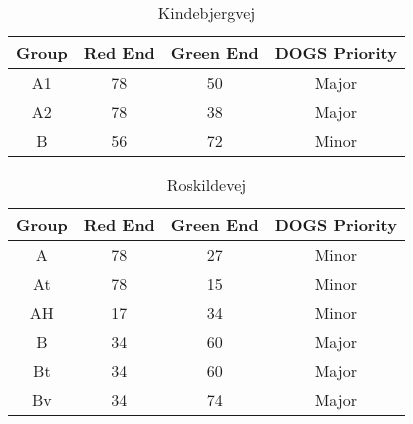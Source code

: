 \begin{table}[ht]
\centering
\begin{tabular}{c|c|c|c}
\textbf{Group} & \textbf{Red End} & \textbf{Green End} & \textbf{DOGS Priority}\\ \hline
A1 & 78 & 50 & Major\\
A2 & 78 & 38 & Major\\
B & 56 & 72 & Minor\\
\end{tabular}
\caption{Kindebjergvej}
\end{table}

\begin{table}[ht]
\centering
\begin{tabular}{c|c|c|c}
\textbf{Group} & \textbf{Red End} & \textbf{Green End} & \textbf{DOGS Priority}\\ \hline
A & 78 & 27 & Minor\\
At & 78 & 15 & Minor\\
AH & 17 & 34 & Minor\\
B & 34 & 60 & Major\\
Bt & 34 & 60 & Major\\
Bv & 34 & 74 & Major\\
\end{tabular}
\caption{Roskildevej}
\end{table}

\clearpage
